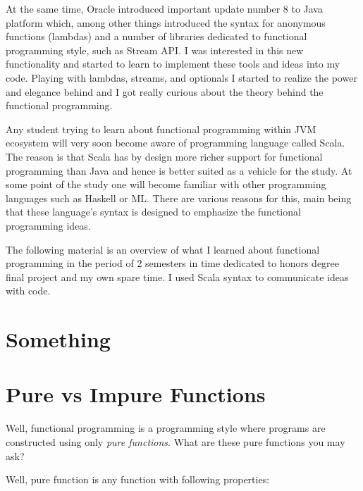 \documentclass[12pt,twoside,a4paper]{report}
\begin{document}
At the same time, Oracle introduced important update number 8 to Java platform which, among other things introduced the syntax for anonymous functions (lambdas) and a number of libraries dedicated to functional programming style, such as Stream API. I was interested in this new functionality and started to learn to implement these tools and ideas into my code. Playing with lambdas, streams, and optionals I started to realize the power and elegance behind and I got really curious about the theory behind the functional programming.

Any student trying to learn about functional programming within JVM ecosystem will very soon become aware of programming language called Scala. The reason is that Scala has by design more richer support for functional programming than Java and hence is better suited as a vehicle for the study. At some point of the study one will become familiar with other programming languages such as Haskell or ML. There are various reasons for this, main being that these language's syntax is designed to emphasize the functional programming ideas.

The following material is an overview of what I learned about functional programming in the period of 2 semesters in time dedicated to honors degree final project and my own spare time. I used Scala syntax to communicate ideas with code.

\section{Something}\label{6.3}

\section{Pure vs Impure Functions}\label{6.4}
Well, functional programming is a programming style where programs are constructed using only \emph{pure functions}. What are these pure functions you may ask? 

Well, pure function is any function with following properties:
\end{document}
